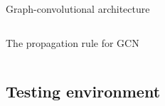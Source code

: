 \documentclass[english, aspectratio=169]{beamer}
\begin{document}
\begin{frame}{Graph-convolutional architecture}
\begin{columns}
\begin{column}{0.6\textwidth}
\begin{center}
{\begin{block}{The propagation rule for GCN}
		\end{block}
	}
	
	\end{center}
\end{column}

\end{columns}
\end{frame}


\subsection{Testing environment}
\end{document}
